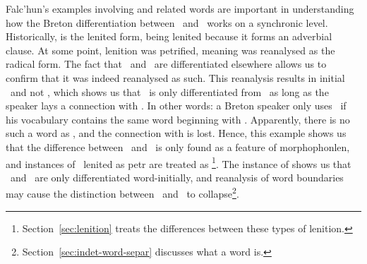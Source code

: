 Falc'hun's examples involving  and related words  are important in understanding how the Breton differentiation between \xD\ and \lT\ works on a synchronic level. Historically,  is the lenited form, being lenited because it forms an adverbial clause. At some point, lenition was petrified, meaning   was reanalysed as the radical form. The fact that \xD\ and \lT\ are differentiated elsewhere allows us to confirm that it was indeed reanalysed as such. This reanalysis results in initial \xD\ and not \lT, which shows us that \lT\ is only differentiated from \xD\ as long as the speaker lays a connection with \xT. In other words: a Breton speaker only uses \lT\ if his vocabulary contains the same word beginning with \xT. Apparently, there is no such a word as , and the connection with  is lost. Hence, this example shows us that the difference between \lT\ and \xD\ is only found as a feature of \gls{morphophonlen}, and instances of \lT\ lenited as \gls{petr} are treated as \xD\footnote{ Section~\ref{sec:lenition} treats the differences between these types of lenition.}. The instance of  shows us that \lT\ and \xD\ are only differentiated word-initially, and reanalysis of word boundaries may cause the distinction between \lT\ and \xD\ to collapse\footnote{Section~\ref{sec:indet-word-separ} discusses what a word is.}.






